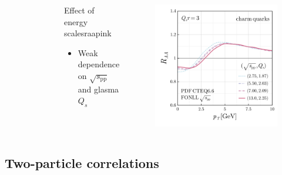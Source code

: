 \documentclass[aspectratio=169,11pt,usenames,dvipsnames]{beamer}
\begin{document}
\begin{frame}
\begin{center}
\begin{columns}[onlytextwidth,t]
\begin{figure}
            \end{figure}
            \begin{center}
                \begin{custombox}{\normalsize Effect of energy scales}{raapink}
                    \small
                    \begin{varwidth}{0.95\textwidth}
                    \begin{itemize}
                        \itemsep0em
                        \footnotesize
                        \item Weak dependence on $\sqrt{s_\mathrm{pp}}$ and glasma $Q_s$
                    \end{itemize}
                    \end{varwidth}
                \end{custombox}
            \end{center}
            \vspace{-10pt}
            \vspace{-7pt}
            \begin{figure}
                \centering
                \includegraphics[width=0.83\columnwidth]{images/clean_raa_tau_dep_charm_quark_Qs_fonll_energy_dep_qsenergymap_v3.png}
            \end{figure}
        \end{columns}    
    \end{center}
\end{frame}


\subsection{Two-particle correlations}
\end{document}
